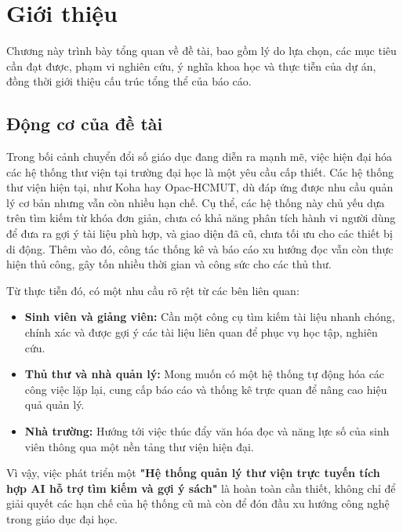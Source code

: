 
\chapter{Giới thiệu}
\label{chap:GioiThieu}

Chương này trình bày tổng quan về đề tài, bao gồm lý do lựa chọn, các mục tiêu cần đạt được, phạm vi nghiên cứu, ý nghĩa khoa học và thực tiễn của dự án, đồng thời giới thiệu cấu trúc tổng thể của báo cáo.
\section{Động cơ của đề tài}
\label{sec:DongCo}

Trong bối cảnh chuyển đổi số giáo dục đang diễn ra mạnh mẽ, việc hiện đại hóa các hệ thống thư viện tại trường đại học là một yêu cầu cấp thiết. Các hệ thống thư viện hiện tại, như Koha hay Opac-HCMUT, dù đáp ứng được nhu cầu quản lý cơ bản nhưng vẫn còn nhiều hạn chế. Cụ thể, các hệ thống này chủ yếu dựa trên tìm kiếm từ khóa đơn giản, chưa có khả năng phân tích hành vi người dùng để đưa ra gợi ý tài liệu phù hợp, và giao diện đã cũ, chưa tối ưu cho các thiết bị di động. Thêm vào đó, công tác thống kê và báo cáo xu hướng đọc vẫn còn thực hiện thủ công, gây tốn nhiều thời gian và công sức cho các thủ thư.

Từ thực tiễn đó, có một nhu cầu rõ rệt từ các bên liên quan:
\begin{itemize}
    \item \textbf{Sinh viên và giảng viên:} Cần một công cụ tìm kiếm tài liệu nhanh chóng, chính xác và được gợi ý các tài liệu liên quan để phục vụ học tập, nghiên cứu.
    \item \textbf{Thủ thư và nhà quản lý:} Mong muốn có một hệ thống tự động hóa các công việc lặp lại, cung cấp báo cáo và thống kê trực quan để nâng cao hiệu quả quản lý.
    \item \textbf{Nhà trường:} Hướng tới việc thúc đẩy văn hóa đọc và năng lực số của sinh viên thông qua một nền tảng thư viện hiện đại.
\end{itemize}

Vì vậy, việc phát triển một \textbf{"Hệ thống quản lý thư viện trực tuyến tích hợp AI hỗ trợ tìm kiếm và gợi ý sách"} là hoàn toàn cần thiết, không chỉ để giải quyết các hạn chế của hệ thống cũ mà còn để đón đầu xu hướng công nghệ trong giáo dục đại học.

